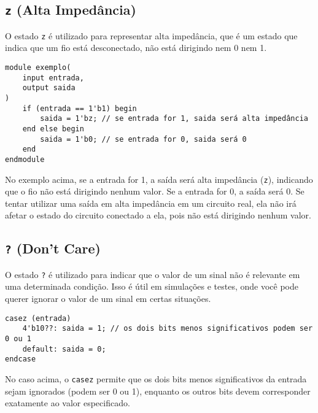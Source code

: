 \documentclass{article}
\begin{document}
\subsection*{\texttt{z} (Alta Impedância)}
O estado \texttt{z} é utilizado para representar alta impedância, que é um estado que indica que um fio está desconectado, não está dirigindo nem 0 nem 1.

\begin{lstlisting}
module exemplo(
    input entrada,
    output saida
)
    if (entrada == 1'b1) begin
        saida = 1'bz; // se entrada for 1, saida será alta impedância
    end else begin
        saida = 1'b0; // se entrada for 0, saida será 0
    end
endmodule
\end{lstlisting}

No exemplo acima, se a entrada for 1, a saída será alta impedância (\texttt{z}), indicando que o fio não está dirigindo nenhum valor. Se a entrada for 0, a saída será 0. Se tentar utilizar uma saída em alta impedância em um circuito real, ela não irá afetar o estado do circuito conectado a ela, pois não está dirigindo nenhum valor.

\subsection*{\texttt{?} (Don't Care)}
O estado \texttt{?} é utilizado para indicar que o valor de um sinal não é relevante em uma determinada condição. Isso é útil em simulações e testes, onde você pode querer ignorar o valor de um sinal em certas situações.

\begin{lstlisting}
casez (entrada)
    4'b10??: saida = 1; // os dois bits menos significativos podem ser 0 ou 1
    default: saida = 0;
endcase
\end{lstlisting}

No caso acima, o \texttt{casez} permite que os dois bits menos significativos da entrada sejam ignorados (podem ser 0 ou 1), enquanto os outros bits devem corresponder exatamente ao valor especificado.
\end{document}
